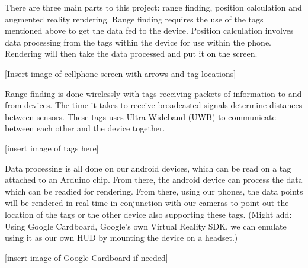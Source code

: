 There are three main parts to this project: range finding, position calculation and augmented reality rendering. Range finding requires the use of the tags mentioned above to get the data fed to the device. Position calculation involves data processing from the tags within the device for use within the phone. Rendering will then take the data processed and put it on the screen.

[Insert image of cellphone screen with arrows and tag locations]

Range finding is done wirelessly with tags receiving packets of information to and from devices. The time it takes to receive broadcasted signals determine distances between sensors. These tags uses Ultra Wideband (UWB) to communicate between each other and the device together.

[insert image of tags here]

Data processing is all done on our android devices, which can be read on a tag attached to an Arduino chip. From there, the android device can process the data which can be readied for rendering. From there, using our phones, the data points will be rendered in real time in conjunction with our cameras to point out the location of the tags or the other device also supporting these tags. (Might add: Using Google Cardboard, Google’s own Virtual Reality SDK, we can emulate using it as our own HUD by mounting the device on a headset.)

[insert image of Google Cardboard if needed]
